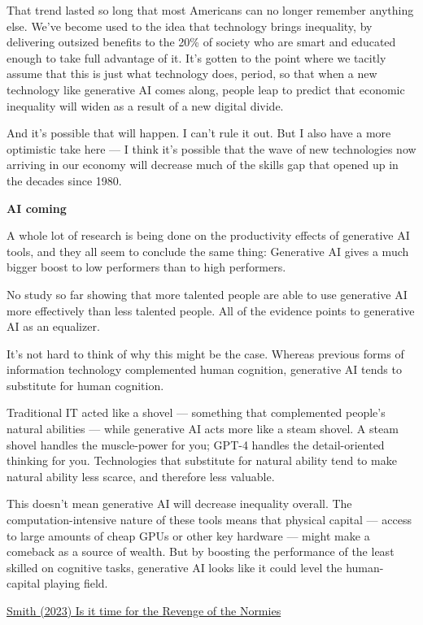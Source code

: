\documentclass[
]{book}
\begin{document}
That trend lasted so long that most Americans can no longer remember anything else. We've become used to the idea that technology brings inequality, by delivering outsized benefits to the 20\% of society who are smart and educated enough to take full advantage of it. It's gotten to the point where we tacitly assume that this is just what technology does, period, so that when a new technology like generative AI comes along, people leap to predict that economic inequality will widen as a result of a new digital divide.

And it's possible that will happen. I can't rule it out. But I also have a more optimistic take here --- I think it's possible that the wave of new technologies now arriving in our economy will decrease much of the skills gap that opened up in the decades since 1980.

\textbf{AI coming}

A whole lot of research is being done on the productivity effects of generative AI tools, and they all seem to conclude the same thing: Generative AI gives a much bigger boost to low performers than to high performers.

No study so far showing that more talented people are able to use generative AI more effectively than less talented people. All of the evidence points to generative AI as an equalizer.

It's not hard to think of why this might be the case. Whereas previous forms of information technology complemented human cognition, generative AI tends to substitute for human cognition.

Traditional IT acted like a shovel --- something that complemented people's natural abilities --- while generative AI acts more like a steam shovel. A steam shovel handles the muscle-power for you; GPT-4 handles the detail-oriented thinking for you. Technologies that substitute for natural ability tend to make natural ability less scarce, and therefore less valuable.

This doesn't mean generative AI will decrease inequality overall. The computation-intensive nature of these tools means that physical capital --- access to large amounts of cheap GPUs or other key hardware --- might make a comeback as a source of wealth. But by boosting the performance of the least skilled on cognitive tasks, generative AI looks like it could level the human-capital playing field.

\href{https://www.noahpinion.blog/p/is-it-time-for-the-revenge-of-the}{Smith (2023) Is it time for the Revenge of the Normies}
\end{document}
